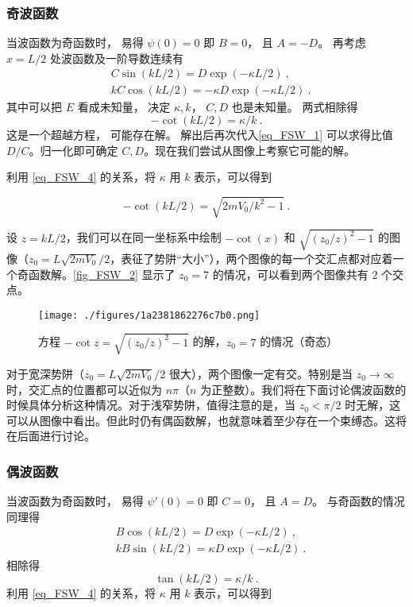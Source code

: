 \subsubsection{奇波函数}
当波函数为奇函数时， 易得 $\psi(0) = 0$ 即 $B = 0$， 且 $A = -D$。 再考虑 $x = L/2$ 处波函数及一阶导数连续有
\begin{equation}\label{eq_FSW_1}
\begin{aligned}
&C\sin(k L/2) = D \exp(-\kappa L/2)~,\\
&k C \cos(k L/2) = -\kappa D \exp(-\kappa L/2)~.
\end{aligned}
\end{equation}
其中可以把 $E$ 看成未知量， 决定 $\kappa, k$， $C,D$ 也是未知量。 两式相除得
\begin{equation}\label{eq_FSW_2}
-\cot(k L/2) = \kappa /k~.
\end{equation}
这是一个超越方程， 可能存在解。 解出后再次代入\autoref{eq_FSW_1} 可以求得比值 $D/C$。归一化即可确定 $C, D$。现在我们尝试从图像上考察它可能的解。

利用 \autoref{eq_FSW_4} 的关系，将 $\kappa$ 用 $k$ 表示，可以得到

\begin{equation}\label{eq_FSW_5}
-\cot(k L/2)=\sqrt{2mV_0/k^2-1}~.
\end{equation}

设 $z=k L/2$，我们可以在同一坐标系中绘制 $-\cot(x)$ 和 $\sqrt{(z_0/z)^2-1}$ 的图像（$z_0=L\sqrt{2mV_0}/2$，表征了势阱“大小”），两个图像的每一个交汇点都对应着一个奇函数解。\autoref{fig_FSW_2} 显示了 $z_0=7$ 的情况，可以看到两个图像共有 $2$ 个交点。

\begin{figure}[ht]
\centering
\texttt{[image: ./figures/1a2381862276c7b0.png]}
\caption{方程 $-\cot z=\sqrt{(z_0/z)^2-1}$ 的解，$z_0=7$ 的情况（奇态）} \label{fig_FSW_2}
\end{figure}

对于宽深势阱（$z_0=L\sqrt{2mV_0}/2$ 很大），两个图像一定有交。特别是当 $z_0\rightarrow\infty$ 时，交汇点的位置都可以近似为 $n\pi$（$n$ 为正整数）。我们将在下面讨论偶波函数的时候具体分析这种情况。对于浅窄势阱，值得注意的是，当 $z_0<\pi/2$ 时无解，这可以从图像中看出。但此时仍有偶函数解，也就意味着至少存在一个束缚态。这将在后面进行讨论。

\subsubsection{偶波函数}
当波函数为奇函数时， 易得 $\psi'(0) = 0$ 即 $C = 0$， 且 $A = D$。 与奇函数的情况同理得
\begin{equation}
\begin{aligned}
&B\cos(k L/2) = D \exp(-\kappa L/2)~,\\
&k B \sin(k L/2) = \kappa D \exp(-\kappa L/2)~.
\end{aligned}
\end{equation}
相除得
\begin{equation}\label{eq_FSW_3}
\tan(k L/2) = \kappa /k~.
\end{equation}
利用 \autoref{eq_FSW_4} 的关系，将 $\kappa $ 用 $k$ 表示，可以得到

